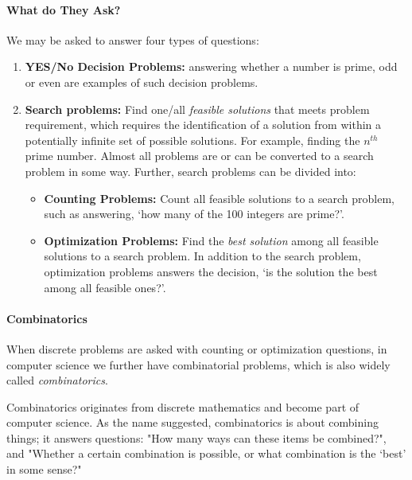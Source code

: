 \documentclass[../main.tex]{subfiles}
\begin{document}
\paragraph{What do They Ask?}
We may be asked to answer four types of questions:
\begin{enumerate}
    \item \textbf{YES/No Decision Problems:} answering whether a number is prime, odd or even are examples of such decision problems. 
    \item \textbf{Search problems:} Find one/all \textit{feasible solutions} that meets problem requirement, which requires the identification of a solution from within a potentially infinite set of possible solutions. For example, finding the $n^{th}$ prime number. Almost all problems are or can be converted to a search problem in some way. Further, search problems can be divided into:
    \begin{itemize}
    \item \textbf{Counting Problems:} Count all feasible solutions to a search problem, such as answering, `how many of the 100 integers are prime?'.
    \item \textbf{Optimization Problems:} Find the \textit{best solution} among all feasible solutions to a search problem.  In addition to the search problem, optimization problems answers the decision, `is the solution the best among all feasible ones?'. 
    \end{itemize}
\end{enumerate}

\paragraph{Combinatorics}
When discrete problems are asked with counting or optimization questions, in computer science we further have combinatorial problems, which is also widely called \textit{combinatorics}.  

Combinatorics originates from discrete mathematics and become part of computer science. As the name suggested, combinatorics is about combining things; it answers questions: "How many ways can these items be combined?", and "Whether a certain combination is possible, or what combination is the `best' in some sense?" 
\end{document}
